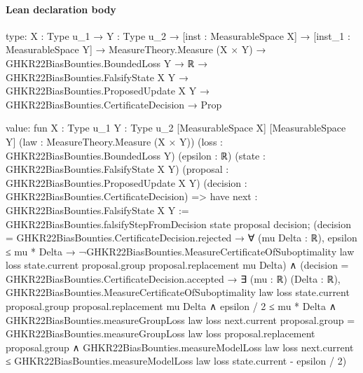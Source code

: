 \documentclass[10pt]{article}
\begin{document}
\paragraph{Lean declaration body}
\begin{ReviewVerbatim}
type:
{X : Type u_1} →
  {Y : Type u_2} →
    [inst : MeasurableSpace X] →
      [inst_1 : MeasurableSpace Y] →
        MeasureTheory.Measure (X × Y) →
          GHKR22BiasBounties.BoundedLoss Y →
            ℝ →
              GHKR22BiasBounties.FalsifyState X Y →
                GHKR22BiasBounties.ProposedUpdate X Y → GHKR22BiasBounties.CertificateDecision → Prop

value:
fun {X : Type u_1} {Y : Type u_2} [MeasurableSpace X] [MeasurableSpace Y] (law : MeasureTheory.Measure (X × Y))
    (loss : GHKR22BiasBounties.BoundedLoss Y) (epsilon : ℝ) (state : GHKR22BiasBounties.FalsifyState X Y)
    (proposal : GHKR22BiasBounties.ProposedUpdate X Y) (decision : GHKR22BiasBounties.CertificateDecision) =>
  have next : GHKR22BiasBounties.FalsifyState X Y := GHKR22BiasBounties.falsifyStepFromDecision state proposal decision;
  (decision = GHKR22BiasBounties.CertificateDecision.rejected →
      ∀ (mu Delta : ℝ),
        epsilon ≤ mu * Delta →
          ¬GHKR22BiasBounties.MeasureCertificateOfSuboptimality law loss state.current proposal.group
              proposal.replacement mu Delta) ∧
    (decision = GHKR22BiasBounties.CertificateDecision.accepted →
      ∃ (mu : ℝ) (Delta : ℝ),
        GHKR22BiasBounties.MeasureCertificateOfSuboptimality law loss state.current proposal.group proposal.replacement
            mu Delta ∧
          epsilon / 2 ≤ mu * Delta ∧
            GHKR22BiasBounties.measureGroupLoss law loss next.current proposal.group =
                GHKR22BiasBounties.measureGroupLoss law loss proposal.replacement proposal.group ∧
              GHKR22BiasBounties.measureModelLoss law loss next.current ≤
                GHKR22BiasBounties.measureModelLoss law loss state.current - epsilon / 2)
\end{ReviewVerbatim}
\end{document}
